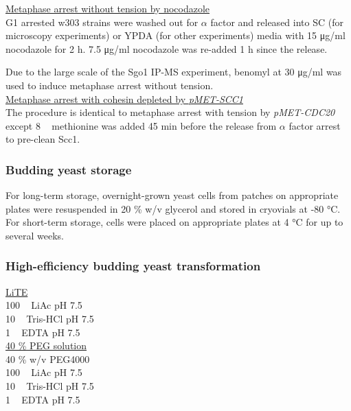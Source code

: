 \underline{Metaphase arrest without tension by nocodazole}\\
G1 arrested w303 strains were washed out for $\alpha$ factor and released into SC (for microscopy experiments) or YPDA (for other experiments) media with 15 \si{\micro\gram/\milli\litre} nocodazole for 2 \si{\hour}. 7.5 \si{\micro\gram/\milli\litre} nocodazole was re-added 1 \si{\hour} since the release.

Due to the large scale of the Sgo1 IP-MS experiment, benomyl at 30 \si{\micro\gram/\milli\litre} was used to induce metaphase arrest without tension. \\

\underline{Metaphase arrest with cohesin depleted by \textit{pMET-SCC1}}\\
The procedure is identical to metaphase arrest with tension by \textit{pMET-CDC20} except 8 \si{\milli\Molar} methionine was added 45 \si{\minute} before the release from $\alpha$ factor arrest to pre-clean Scc1. \\

\subsubsection{Budding yeast storage}
For long-term storage, overnight-grown yeast cells from patches on appropriate plates were resuspended in 20 \% w/v glycerol and stored in cryovials at -80 \si{\celsius}. For short-term storage, cells were placed on appropriate plates at 4 \si{\celsius} for up to several weeks.

\subsubsection{High-efficiency budding yeast transformation}

\underline{LiTE}\\
100 \si{\milli\Molar} LiAc pH 7.5 \\
10 \si{\milli\Molar} Tris-HCl pH 7.5 \\ 
1 \si{\milli\Molar} EDTA pH 7.5 \\

\underline{40 \% PEG solution}\\
40 \% w/v PEG4000\\
100 \si{\milli\Molar} LiAc pH 7.5\\
10 \si{\milli\Molar} Tris-HCl pH 7.5\\
1 \si{\milli\Molar} EDTA pH 7.5\\

